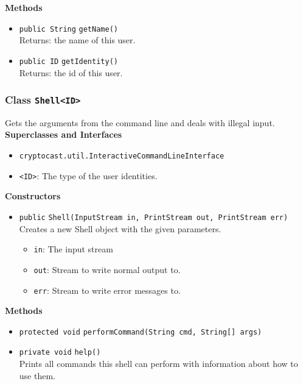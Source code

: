 \textbf{Methods}
\begin{itemize}
\item \lstinline|public String| \lstinline|getName|\lstinline|()|\\
Returns: the name of this user.



\item \lstinline|public ID| \lstinline|getIdentity|\lstinline|()|\\
Returns: the id of this user.



\end{itemize}

\subsubsection{Class \lstinline|Shell<ID>|}
Gets the arguments from the command line and deals with illegal input. \\


\textbf{Superclasses and Interfaces}
\begin{itemize}
\item \lstinline|cryptocast.util.InteractiveCommandLineInterface|
\end{itemize}

\begin{itemize}
\item \lstinline|<ID>|: The type of the user identities.
\end{itemize}


\textbf{Constructors}
\begin{itemize}
\item \lstinline|public| \lstinline|Shell|\lstinline|(InputStream in, PrintStream out, PrintStream err)|\\
Creates a new Shell object with the given parameters.
\begin{itemize}
\item \lstinline|in|: The input stream
\item \lstinline|out|: Stream to write normal output to.
\item \lstinline|err|: Stream to write error messages to.
\end{itemize}



\end{itemize}


\textbf{Methods}
\begin{itemize}
\item \lstinline|protected void| \lstinline|performCommand|\lstinline|(String cmd, String[] args)|




\item \lstinline|private void| \lstinline|help|\lstinline|()|\\
Prints all commands this shell can perform with information about how to use them.



\end{itemize}

